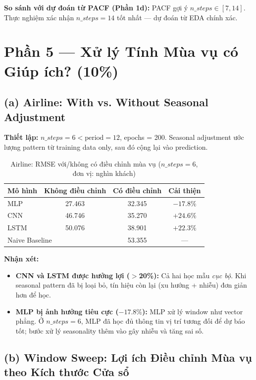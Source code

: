 \documentclass[12pt,a4paper]{article}
\begin{document}
\textbf{So sánh với dự đoán từ PACF (Phần 1d):} PACF gợi ý $n\_steps \in [7, 14]$. Thực nghiệm xác nhận $n\_steps = 14$ tốt nhất --- dự đoán từ EDA chính xác.

\section{Phần 5 --- Xử lý Tính Mùa vụ có Giúp ích? (10\%)}

\subsection{(a) Airline: With vs. Without Seasonal Adjustment}

\textbf{Thiết lập:} $n\_steps = 6 < \text{period} = 12$, epochs = 200. Seasonal adjustment ước lượng pattern từ training data only, sau đó cộng lại vào prediction.

\begin{table}[H]
\centering
\caption{Airline: RMSE với/không có điều chỉnh mùa vụ ($n\_steps=6$, đơn vị: nghìn khách)}
\begin{tabular}{lccc}
\toprule
\textbf{Mô hình} & \textbf{Không điều chỉnh} & \textbf{Có điều chỉnh} & \textbf{Cải thiện} \\
\midrule
MLP  & 27.463 & 32.345 & $-17.8\%$ \\
CNN  & 46.746 & 35.270 & $+24.6\%$ \\
LSTM & 50.076 & 38.901 & $+22.3\%$ \\
\midrule
\multicolumn{2}{l}{Naive Baseline} & 53.355 & --- \\
\bottomrule
\end{tabular}
\end{table}

\textbf{Nhận xét:}
\begin{itemize}
    \item \textbf{CNN và LSTM được hưởng lợi ($>$20\%):} Cả hai học mẫu \textit{cục bộ}. Khi seasonal pattern đã bị loại bỏ, tín hiệu còn lại (xu hướng + nhiễu) đơn giản hơn để học.
    \item \textbf{MLP bị ảnh hưởng tiêu cực ($-17.8\%$):} MLP xử lý window như vector phẳng. Ở $n\_steps=6$, MLP đã học đủ thông tin vị trí tương đối để dự báo tốt; bước xử lý seasonality thêm vào gây nhiễu và tăng sai số.
\end{itemize}

\subsection{(b) Window Sweep: Lợi ích Điều chỉnh Mùa vụ theo Kích thước Cửa sổ}
\end{document}

